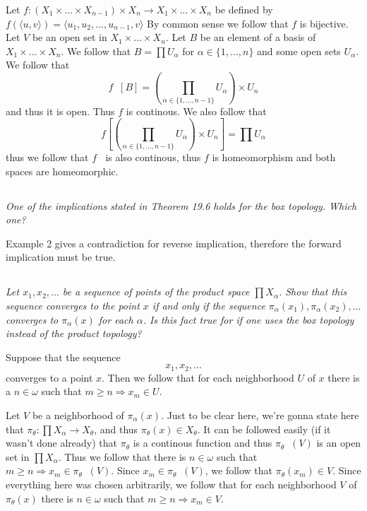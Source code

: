 \documentclass[11pt,oneside,titlepage]{book}
\DeclareMathOperator \inv {^{-1}}
\DeclareMathOperator \ra {\Rightarrow}
\newcommand{\eangle}[1]{\langle #1 \rangle}
\newcommand{\set}[1]{\{ #1 \}}
\begin{document}
Let $f: (X_1 \times ... \times X_{n - 1}) \times X_n \to X_1 \times ... \times X_n$
be defined by
$f(\eangle{u, v}) = \eangle{u_1, u_2, ..., u_{n - 1}, v}$
By common sense we follow that $f$ is bijective. Let $V$ be an open set in
$X_1 \times ... \times X_n$. Let $B$ be an element of a basis of $X_1 \times ... \times X_n$.
We follow that $B = \prod U_\alpha$ for $\alpha \in \set{1, ..., n}$ and some open
sets $U_\alpha$. We follow that
$$f\inv[B] = (\prod_{\alpha \in \set{1, ..., n - 1}} U_\alpha) \times U_n$$ 
and thus it is open. Thus $f$ is continous. We also follow that
$$f\left[\left(\prod_{\alpha \in \set{1, ..., n - 1}}{U_\alpha}\right) \times U_n\right] =
\prod U_\alpha$$
thus we follow that $f\inv$ is also continous, thus $f$ is homeomorphism and both
spaces are homeomorphic.

\subsection{}

\textit{One of the implications stated in Theorem 19.6 holds for the box topology.
  Which one? }

Example 2 gives a contradiction for reverse implication, therefore the forward implication
must be true.

\subsection{}

\textit{Let $x_1, x_2, ... $ be a sequence of points of the product space $\prod X_\alpha$.
  Show that this sequence converges to the point $x$ if and only if the sequence
  $\pi_\alpha(x_1), \pi_\alpha(x_2), ...$  converges to $\pi_\alpha(x)$ for each $\alpha$.
  Is this fact true for if one uses the box topology instead of  the product topology?
}

Suppose that the sequence
$$x_1, x_2, ...$$
converges to a point $x$. Then we follow that for each neighborhood $U$ of $x$ there is a
$n \in \omega$ such that $m \geq n \ra x_m \in U$.

Let $V$ be a neighborhood of $\pi_\alpha(x)$. Just to be clear here, we're gonna state here
that $\pi_\theta: \prod X_\alpha \to X_\theta$, and thus $\pi_\theta(x) \in X_\theta$.
It can be followed easily (if it wasn't done already) that $\pi_\theta$ is a continous function
and thus $\pi_\theta\inv(V)$ is an open set in $\prod X_\alpha$. Thus we follow that there
is $n \in \omega$ such that $m \geq n \ra x_m \in \pi_\theta\inv(V)$. Since
$x_m \in \pi_\theta\inv(V)$, we follow that $\pi_\theta(x_m) \in V$. Since everything here
was chosen arbitrarily, we follow that for each neighborhood $V$ of $\pi_\theta(x)$ there
is $n \in \omega$ such that $m \geq n \ra x_m \in V$.
\end{document}
